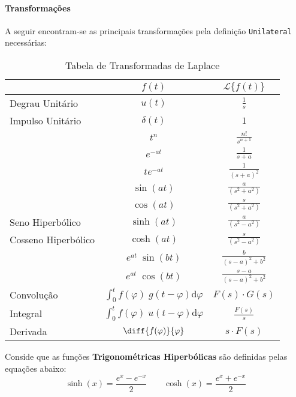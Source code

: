 \documentclass{article}
\begin{document}
            \paragraph{Transformações}A seguir encontram-se as principais transformações pela definição \texttt{Unilateral} necessárias:
                \begin{table}[H]
                    \centering
                    \begingroup
                    \renewcommand{\arraystretch}{1.25}
                    \begin{tabular}[]{lcc}
                                         & $f(t)$      & $\mathcal{L}\{ f(t) \}$\\\hline
                        Degrau Unitário  & $u(t)$      & $\frac{1}{s}$\\
                        Impulso Unitário & $\delta(t)$ & $1$\\
                                         & $t^{n}$     & $\frac{n!}{s^{n+1}}$\\
                                         & $e^{-at}$   & $\frac{1}{s+a}$\\
                                         & $te^{-at}$  & $\frac{1}{(s+a)^{2}}$\\
                                         & $\sin(at)$  & $\frac{a}{(s^2+a^2)}$\\
                                         & $\cos(at)$  & $\frac{s}{(s^2+a^2)}$\\
                        Seno Hiperbólico    & $\sinh(at)$  & $\frac{a}{(s^2-a^2)}$\\
                        Cosseno Hiperbólico & $\cosh(at)$  & $\frac{s}{(s^2-a^2)}$\\
                                         & $e^{at}\;\sin(bt)$  & $\frac{b}{(s-a)^2+b^2}$\\
                                         & $e^{at}\;\cos(bt)$  & $\frac{s-a}{(s-a)^2+b^2}$\\
                        Convolução       & $\int_{0}^{t} f(\varphi)\;g(t - \varphi) \text{d}\varphi$ & $F(s)\cdot G(s)$\\
                        Integral         & $\int_{0}^{t} f(\varphi)\;u(t - \varphi) \text{d}\varphi$ & $\frac{F(s)}{s}$\\
                        Derivada         & $\diff{f(\varphi)}{\varphi} $ & $s\cdot F(s)$\\\hline
                    \end{tabular}
                    \endgroup
                    \caption{Tabela de Transformadas de Laplace}\label{table:Laplace}
                \end{table} \noindent
            Conside que as funções \textbf{Trigonométricas Hiperbólicas} são definidas pelas equações abaixo:
                \begin{equation}
                    \boxed{
                        \sinh(x) = \frac{e^{x} - e^{-x}}{2}
                    }
                    \qquad
                    \boxed{
                        \cosh(x) = \frac{e^{x} + e^{-x}}{2}
                    }
                \end{equation}
            \newpage
\end{document}
